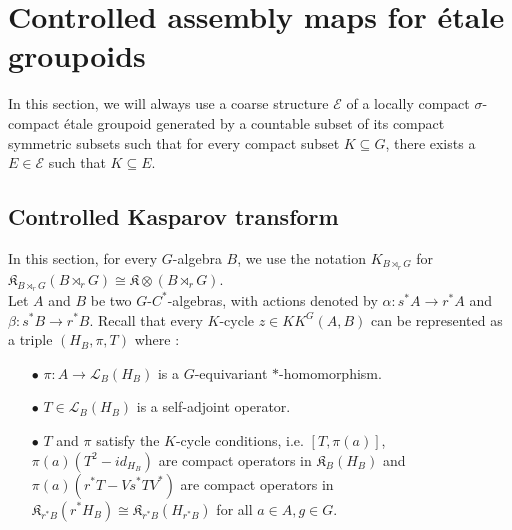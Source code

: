 \section{Controlled assembly maps for étale groupoids}

In this section, we will always use a coarse structure $\mathcal E$ of a locally compact $\sigma$-compact étale groupoid generated by a countable subset of its compact symmetric subsets such that for every compact subset $K\subseteq G$, there exists a $E\in\mathcal E$ such that $K\subseteq E$.

\subsection{Controlled Kasparov transform} %


In this section, for every $G$-algebra $B$, we use the notation $K_{B\rtimes_r G}$ for $\mathfrak K_{B \rtimes_r G}(B \rtimes_r G)\cong \mathfrak K \otimes (B\rtimes_r G)$.\\

Let $A$ and $B$ be two $G$-$C^*$-algebras, with actions denoted by $\alpha : s^* A \rightarrow r^* A$ and $\beta : s^* B \rightarrow r^* B$. %
Recall that every $K$-cycle $z\in KK^G(A,B)$ can be represented as a triple $(H_B, \pi, T)$ where :
\begin{itemize}
\item[$\bullet$]$\pi : A\rightarrow \mathcal L_B(H_B)$ is a $G$-equivariant $*$-homomorphism.
\item[$\bullet$]$T\in \mathcal L_B(H_B)$ is a self-adjoint operator.
\item[$\bullet$] $T$ and $\pi$ satisfy the $K$-cycle conditions, i.e. $[T,\pi(a)]$, $\pi(a)(T^2-id_{H_B})$ are compact operators in $\mathfrak K_B(H_B)$ and $\pi(a)(r^*T-Vs^*T V^*)$ are compact operators in $\mathfrak K_{r^* B}(r^* H_B)\cong \mathfrak K_{r^* B}(H_{r^* B})$ for all $a\in A, g\in G$.\\
\end{itemize}

